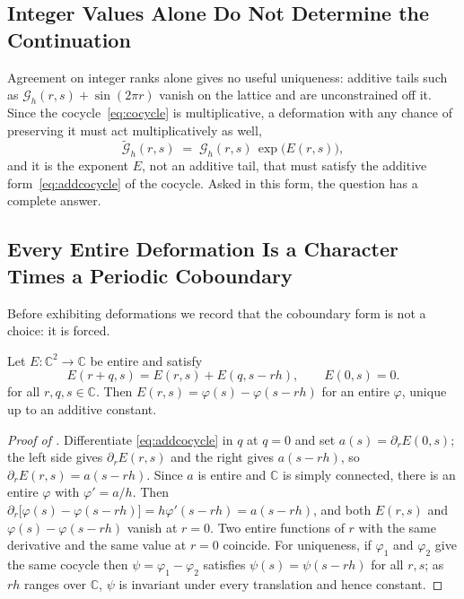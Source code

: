 \documentclass[11pt,letterpaper]{article}
\newcommand{\Gc}{\mathcal{G}}               %
\newcommand{\Cc}{\mathbb{C}}
\begin{document}
\subsection{Integer Values Alone Do Not Determine the Continuation}
\label{sec:intvalues}

Agreement on integer ranks alone gives no useful uniqueness: additive tails such
as $\Gc_h(r,s)+\sin(2\pi r)$ vanish on the lattice and are unconstrained off it.
Since the cocycle~\eqref{eq:cocycle} is multiplicative, a deformation with any
chance of preserving it must act multiplicatively as well,
\begin{equation}
  \widetilde{\Gc}_h(r,s)\;=\;\Gc_h(r,s)\,\exp\bigl(E(r,s)\bigr),
  \label{eq:deform}
\end{equation}
and it is the exponent $E$, not an additive tail, that must satisfy the additive
form~\eqref{eq:addcocycle} of the cocycle. Asked in this form, the question has a complete
answer.

\subsection{Every Entire Deformation Is a Character Times a Periodic Coboundary}

Before exhibiting deformations we record that the coboundary form is not a
choice: it is forced.

\begin{lemma}
\label{lem:coclass}
Let $E:\Cc^{2}\to\Cc$ be entire and satisfy
\begin{equation}
  E(r+q,s)=E(r,s)+E(q,s-rh),\qquad E(0,s)=0 .
  \label{eq:addcocycle}
\end{equation}
for all $r,q,s\in\Cc$. Then $E(r,s)=\varphi(s)-\varphi(s-rh)$ for an entire
$\varphi$, unique up to an additive constant.
\end{lemma}

\begin{proof}[Proof of ]
Differentiate \eqref{eq:addcocycle} in $q$ at $q=0$ and set
$a(s)=\partial_rE(0,s)$; the left side gives $\partial_rE(r,s)$ and the right
gives $a(s-rh)$, so $\partial_rE(r,s)=a(s-rh)$. Since $a$ is entire and $\Cc$ is simply connected, there is an entire $\varphi$
with $\varphi'=a/h$. Then
$\partial_r\bigl[\varphi(s)-\varphi(s-rh)\bigr]=h\varphi'(s-rh)=a(s-rh)$, and
both $E(r,s)$ and $\varphi(s)-\varphi(s-rh)$ vanish at $r=0$. Two entire functions of $r$ with the same
derivative and the same value at $r=0$ coincide. For uniqueness, if $\varphi_1$
and $\varphi_2$ give the same cocycle then $\psi=\varphi_1-\varphi_2$ satisfies
$\psi(s)=\psi(s-rh)$ for all $r,s$; as $rh$ ranges over $\Cc$, $\psi$ is
invariant under every translation and hence constant.
\end{proof}
\end{document}
